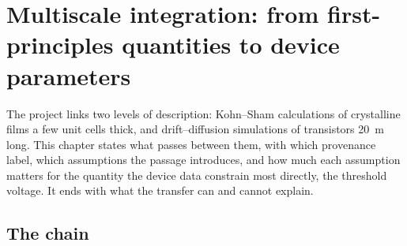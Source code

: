 \chapter{Multiscale integration: from first-principles quantities to device parameters}
\label{ch:mono-multiscale}

The project links two levels of description: Kohn--Sham calculations of crystalline films a few unit cells thick, and
drift--diffusion simulations of transistors 20~\textmu m long. This chapter states what passes between them, with which
provenance label, which assumptions the passage introduces, and how much each assumption matters for the quantity the
device data constrain most directly, the threshold voltage. It ends with what the transfer can and cannot explain.

\section{The chain}
\label{sec:mono-ms-chain}

